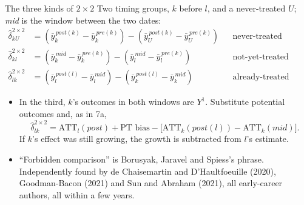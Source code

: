 \documentclass[
  11pt,
  ignorenonframetext,
  aspectratio=169,
]{beamer}
\providecommand{\tightlist}{%
  \setlength{\itemsep}{0pt}\setlength{\parskip}{0pt}}
\begin{document}
\begin{frame}{The three kinds of \(2 \times 2\)}
\protect{}\label{the-three-kinds-of-2-times-2}
Two timing groups, \(k\) before \(l\), and a never-treated \(U\);
\emph{mid} is the window between the two dates: \[
\begin{aligned}
\hat\delta^{2\times2}_{kU} &= (\bar y_k^{\,post(k)} - \bar y_k^{\,pre(k)}) - (\bar y_U^{\,post(k)} - \bar y_U^{\,pre(k)}) &&\text{never-treated control: legal} \\[2pt]
\hat\delta^{2\times2}_{kl} &= (\bar y_k^{\,mid} - \bar y_k^{\,pre(k)}) - (\bar y_l^{\,mid} - \bar y_l^{\,pre(k)}) &&\text{not-yet-treated control: legal} \\[2pt]
\hat\delta^{2\times2}_{lk} &= (\bar y_l^{\,post(l)} - \bar y_l^{\,mid}) - (\bar y_k^{\,post(l)} - \bar y_k^{\,mid}) &&\text{already-treated control: forbidden}
\end{aligned}
\]

\begin{itemize}
\tightlist
\item
  In the third, \(k\)'s outcomes in both windows are \(Y^1\). Substitute
  potential outcomes and, as in 7a, \[
  \hat\delta^{2\times2}_{lk} = \text{ATT}_l(post) + \text{PT bias} - \big[\text{ATT}_k(post(l)) - \text{ATT}_k(mid)\big].
  \] If \(k\)'s effect was still growing, the growth is subtracted from
  \(l\)'s estimate.
\item
  ``Forbidden comparison'' is Borusyak, Jaravel and Spiess's phrase.
  Independently found by de Chaisemartin and D'Haultfoeuille (2020),
  Goodman-Bacon (2021) and Sun and Abraham (2021), all early-career
  authors, all within a few years.
\end{itemize}
\end{frame}
\end{document}
